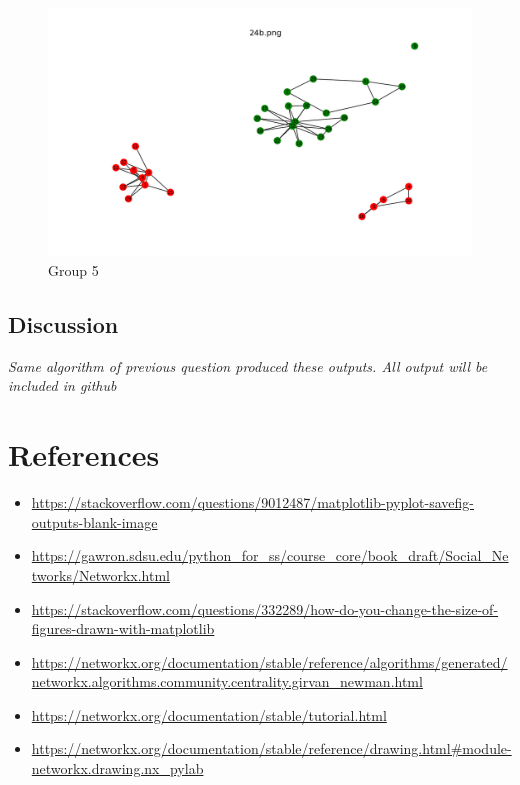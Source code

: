 \documentclass[12pt]{article}
\begin{document}
\begin{figure}[H]
\centering
\includegraphics[trim=0 0 0 0, clip, width=\textwidth] {24b.png}
\caption{ Group 5}
\label{fig:q5}
\end{figure}
\subsection*{Discussion}
\emph{Same algorithm of previous question produced these outputs. All output will be included in github}

\section*{References}
\begin{itemize}
    \item {\url{https://stackoverflow.com/questions/9012487/matplotlib-pyplot-savefig-outputs-blank-image}}
     \item {\url{https://gawron.sdsu.edu/python_for_ss/course_core/book_draft/Social_Networks/Networkx.html}}
     \item{\url{https://stackoverflow.com/questions/332289/how-do-you-change-the-size-of-figures-drawn-with-matplotlib}}
     \item{\url{https://networkx.org/documentation/stable/reference/algorithms/generated/networkx.algorithms.community.centrality.girvan_newman.html}}
     \item{\url{https://networkx.org/documentation/stable/tutorial.html}}
     \item{\url{https://networkx.org/documentation/stable/reference/drawing.html#module-networkx.drawing.nx_pylab}}
     
    
     
\end{itemize}
\end{document}
